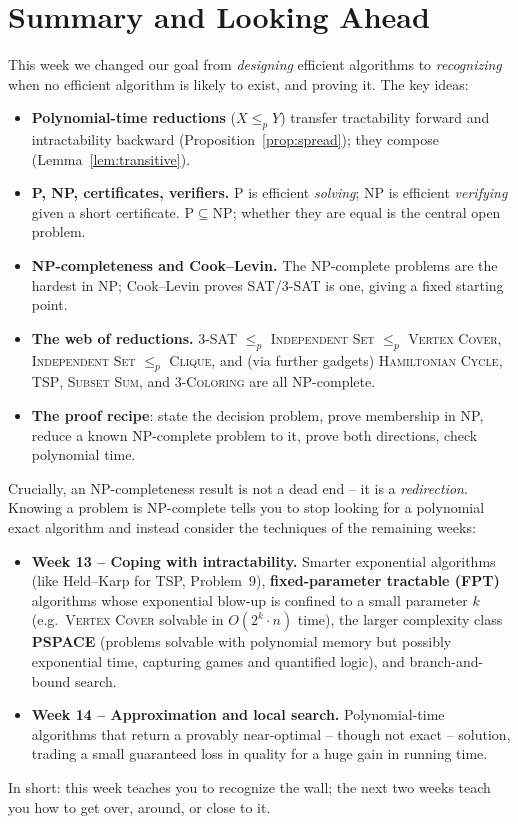 \documentclass[11pt]{article}
\begin{document}
\section{Summary and Looking Ahead}

This week we changed our goal from \emph{designing} efficient algorithms to
\emph{recognizing} when no efficient algorithm is likely to exist, and proving it. The key
ideas:

\begin{itemize}
    \item \textbf{Polynomial-time reductions} ($X \le_p Y$) transfer tractability forward
    and intractability backward (Proposition~\ref{prop:spread}); they compose
    (Lemma~\ref{lem:transitive}).
    \item \textbf{P, NP, certificates, verifiers.} $\mathrm{P}$ is efficient \emph{solving};
    $\mathrm{NP}$ is efficient \emph{verifying} given a short certificate. $\mathrm{P}
    \subseteq \mathrm{NP}$; whether they are equal is the central open problem.
    \item \textbf{NP-completeness and Cook--Levin.} The NP-complete problems are the
    hardest in $\mathrm{NP}$; Cook--Levin proves \textsc{SAT}/\textsc{3-SAT} is one, giving
    a fixed starting point.
    \item \textbf{The web of reductions.} \textsc{3-SAT} $\le_p$ \textsc{Independent Set}
    $\le_p$ \textsc{Vertex Cover}, \textsc{Independent Set} $\le_p$ \textsc{Clique},
    and (via further gadgets) \textsc{Hamiltonian Cycle}, \textsc{TSP}, \textsc{Subset
    Sum}, and \textsc{3-Coloring} are all NP-complete.
    \item \textbf{The proof recipe}: state the decision problem, prove membership in NP,
    reduce a known NP-complete problem to it, prove both directions, check polynomial time.
\end{itemize}

Crucially, an NP-completeness result is not a dead end -- it is a \emph{redirection}.
Knowing a problem is NP-complete tells you to stop looking for a polynomial exact algorithm
and instead consider the techniques of the remaining weeks:

\begin{itemize}
    \item \textbf{Week 13 -- Coping with intractability.} Smarter exponential algorithms
    (like Held--Karp for TSP, Problem~9), \textbf{fixed-parameter tractable (FPT)}
    algorithms whose exponential blow-up is confined to a small parameter $k$ (e.g.\
    \textsc{Vertex Cover} solvable in $O(2^k \cdot n)$ time), the larger complexity class
    \textbf{PSPACE} (problems solvable with polynomial memory but possibly exponential
    time, capturing games and quantified logic), and branch-and-bound search.
    \item \textbf{Week 14 -- Approximation and local search.} Polynomial-time algorithms
    that return a provably near-optimal -- though not exact -- solution, trading a small
    guaranteed loss in quality for a huge gain in running time.
\end{itemize}

In short: this week teaches you to recognize the wall; the next two weeks teach you how to
get over, around, or close to it.
\end{document}
